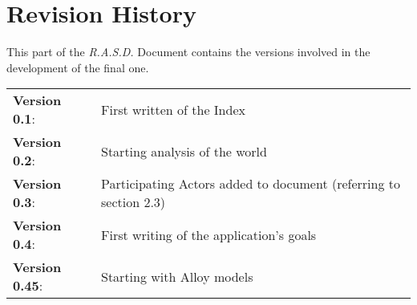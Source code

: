 \section{Revision History}

This part of the \emph{R.A.S.D.} Document contains the versions involved in the development of the final one.

\vspace{10pt}

\begin{tabular}{l l}

	\textbf{Version 0.1}:   & First written of the Index \\
    
    \textbf{Version 0.2}:   & Starting analysis of the world \\

	\textbf{Version 0.3}:   & Participating Actors added to document (referring to section 2.3)\\
    
    \textbf{Version 0.4}:   & First writing of the application's goals\\
    
    \textbf{Version 0.45}:  & Starting with Alloy models\\
    

\end{tabular}
